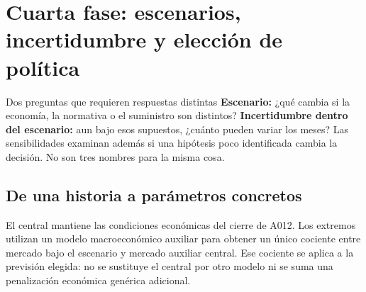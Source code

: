 \section{Cuarta fase: escenarios, incertidumbre y elección de política}\label{sec:escenarios}

\begin{idea}{Dos preguntas que requieren respuestas distintas}
\textbf{Escenario:} ¿qué cambia si la economía, la normativa o el suministro son
distintos? \textbf{Incertidumbre dentro del escenario:} aun bajo esos supuestos,
¿cuánto pueden variar los meses? Las sensibilidades examinan además si una
hipótesis poco identificada cambia la decisión. No son tres nombres para la misma cosa.
\end{idea}

\subsection{De una historia a parámetros concretos}
El central mantiene las condiciones económicas del cierre de A012. Los extremos
utilizan un modelo macroeconómico auxiliar para obtener un único cociente entre
mercado bajo el escenario y mercado auxiliar central. Ese cociente se aplica a
la previsión elegida: no se sustituye el central por otro modelo ni se suma una
penalización económica genérica adicional.


